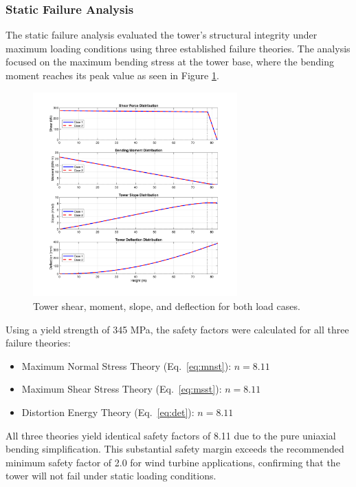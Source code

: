 \documentclass[11pt]{article}
\begin{document}
\subsubsection{Static Failure Analysis}

The static failure analysis evaluated the tower's structural integrity under maximum loading conditions using three established failure theories. The analysis focused on the maximum bending stress at the tower base, where the bending moment reaches its peak value as seen in Figure \ref{fig:tower_deflection_analysis}.

\begin{figure}[H]
  \centering
  \includegraphics[width=0.7\textwidth]{../../PNGS/Tower_Deflection_Analysis.png}
  \caption{Tower shear, moment, slope, and deflection for both load cases.}
  \label{fig:tower_deflection_analysis}
\end{figure}

Using a yield strength of 345 MPa, the safety factors were calculated for all three failure theories:
\begin{itemize}
    \item Maximum Normal Stress Theory (Eq.~\ref{eq:mnst}): $n = 8.11$
    \item Maximum Shear Stress Theory (Eq.~\ref{eq:msst}): $n = 8.11$
    \item Distortion Energy Theory (Eq.~\ref{eq:det}): $n = 8.11$
\end{itemize}

All three theories yield identical safety factors of 8.11 due to the pure uniaxial bending simplification. This substantial safety margin exceeds the recommended minimum safety factor of 2.0 for wind turbine applications, confirming that the tower will not fail under static loading conditions. 
\end{document}
